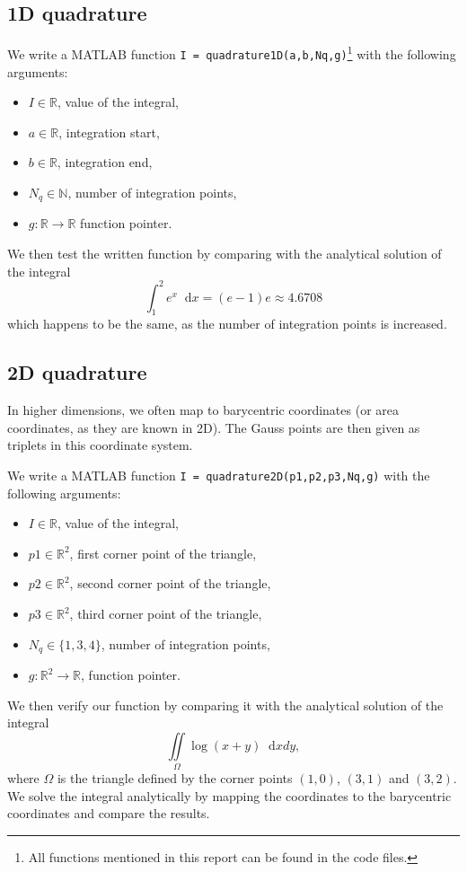 \documentclass{report}
\renewcommand*\d{\mathop{}\!\mathrm{d}}
\begin{document}
\subsection{1D quadrature}
We write a MATLAB function \texttt{I = quadrature1D(a,b,Nq,g)}\footnote{All functions mentioned in this report can be found in the code files.} with the following arguments:
\begin{itemize}
	\item $I\in\mathbb{R}$, value of the integral,
	\item $a\in\mathbb{R}$, integration start,
	\item $b\in\mathbb{R}$, integration end,
	\item $N_q \in\mathbb{N}$, number of integration points,
	\item $g: \mathbb{R} \rightarrow \mathbb{R}$ function pointer.
\end{itemize}
We then test the written function by comparing with the analytical solution of the integral
\begin{equation}
	\int_1^2 e^x \d x = (e-1)e \approx 4.6708
\end{equation}
which happens to be the same, as the number of integration points is increased.

\subsection{2D quadrature} 

In higher dimensions, we often map to barycentric coordinates (or area coordinates, as they are known in 2D). The Gauss points are then given as triplets in this coordinate system.

We write a MATLAB function \texttt{I = quadrature2D(p1,p2,p3,Nq,g)} with the following arguments:
\begin{itemize}
	\item $I\in\mathbb{R}$, value of the integral,
	\item $p1\in\mathbb{R}^2$, first corner point of the triangle,
	\item $p2\in\mathbb{R}^2$, second corner point of the triangle,
	\item $p3\in\mathbb{R}^2$, third corner point of the triangle,
	\item $N_q \in{\{1,3,4\}}$, number of integration points,
	\item $g: \mathbb{R}^2 \rightarrow \mathbb{R}$, function pointer.
\end{itemize}
We then verify our function by comparing it with the analytical solution of the integral
\begin{equation}
	\iint \limits_{\Omega} \log (x+y) \d xdy,
\end{equation}
where $\Omega$ is the triangle defined by the corner points $(1, 0)$, $(3, 1)$ and $(3, 2)$. We solve the integral analytically by mapping the coordinates to the barycentric coordinates and compare the results.  
\end{document}
